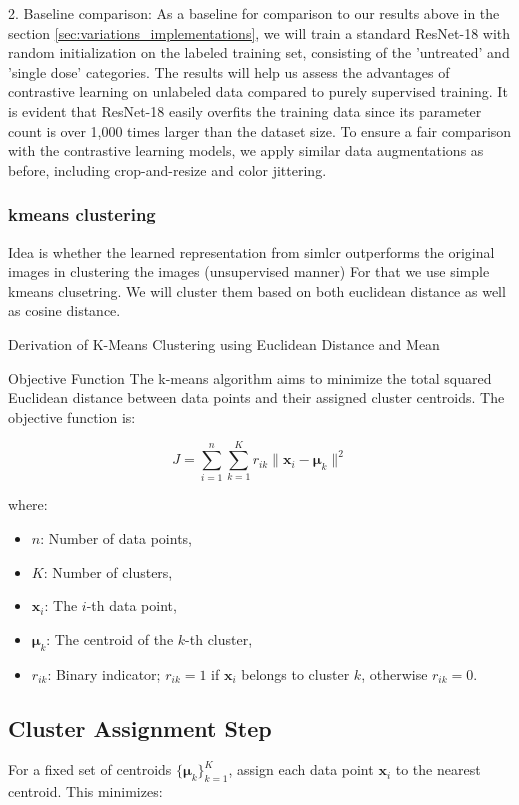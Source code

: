 2. Baseline comparison: As a baseline for comparison  to our results above in the section \ref{sec:variations_implementations}, we will train a standard ResNet-18 with
 random initialization on the labeled training set, consisting of the 'untreated' and 'single dose' categories. The results will help us assess the advantages of contrastive 
 learning on unlabeled data compared to purely supervised training. It is evident that ResNet-18 easily overfits the training data since its parameter count is over 1,000 times 
 larger than the dataset size. To ensure a fair comparison with the contrastive learning models, we apply similar data augmentations as before, including crop-and-resize 
 and color jittering.
\subsubsection{kmeans clustering}
Idea is whether the learned representation from simlcr outperforms the original images in clustering the images (unsupervised manner) For that we use simple kmeans clusetring.
We will cluster them based on both euclidean distance as well as cosine distance.

Derivation of K-Means Clustering using Euclidean Distance and Mean

Objective Function
The k-means algorithm aims to minimize the total squared Euclidean distance between data points and their assigned cluster centroids. The objective function is:

\[
J = \sum_{i=1}^{n} \sum_{k=1}^{K} r_{ik} \| \mathbf{x}_i - \boldsymbol{\mu}_k \|^2
\]

where:
\begin{itemize}
    \item \( n \): Number of data points,
    \item \( K \): Number of clusters,
    \item \( \mathbf{x}_i \): The \( i \)-th data point,
    \item \( \boldsymbol{\mu}_k \): The centroid of the \( k \)-th cluster,
    \item \( r_{ik} \): Binary indicator; \( r_{ik} = 1 \) if \( \mathbf{x}_i \) belongs to cluster \( k \), otherwise \( r_{ik} = 0 \).
\end{itemize}

\subsection*{Cluster Assignment Step}
For a fixed set of centroids \( \{ \boldsymbol{\mu}_k \}_{k=1}^K \), assign each data point \( \mathbf{x}_i \) to the nearest centroid. This minimizes:

